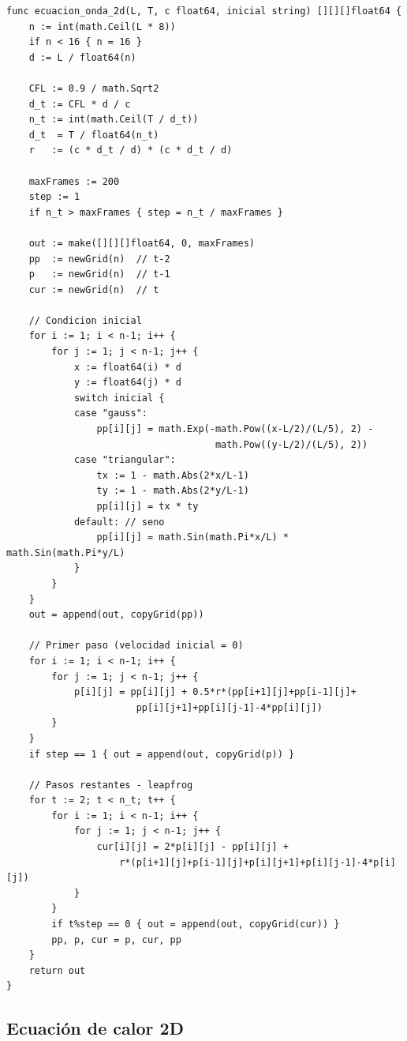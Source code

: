 \documentclass[12pt, a4paper]{article}
\begin{document}
\begin{lstlisting}[style=golang, caption={Solver de la ecuación de onda 2D — \texttt{solver.go}}, label=lst:onda2d]
func ecuacion_onda_2d(L, T, c float64, inicial string) [][][]float64 {
    n := int(math.Ceil(L * 8))
    if n < 16 { n = 16 }
    d := L / float64(n)

    CFL := 0.9 / math.Sqrt2
    d_t := CFL * d / c
    n_t := int(math.Ceil(T / d_t))
    d_t  = T / float64(n_t)
    r   := (c * d_t / d) * (c * d_t / d)

    maxFrames := 200
    step := 1
    if n_t > maxFrames { step = n_t / maxFrames }

    out := make([][][]float64, 0, maxFrames)
    pp  := newGrid(n)  // t-2
    p   := newGrid(n)  // t-1
    cur := newGrid(n)  // t

    // Condicion inicial
    for i := 1; i < n-1; i++ {
        for j := 1; j < n-1; j++ {
            x := float64(i) * d
            y := float64(j) * d
            switch inicial {
            case "gauss":
                pp[i][j] = math.Exp(-math.Pow((x-L/2)/(L/5), 2) -
                                     math.Pow((y-L/2)/(L/5), 2))
            case "triangular":
                tx := 1 - math.Abs(2*x/L-1)
                ty := 1 - math.Abs(2*y/L-1)
                pp[i][j] = tx * ty
            default: // seno
                pp[i][j] = math.Sin(math.Pi*x/L) * math.Sin(math.Pi*y/L)
            }
        }
    }
    out = append(out, copyGrid(pp))

    // Primer paso (velocidad inicial = 0)
    for i := 1; i < n-1; i++ {
        for j := 1; j < n-1; j++ {
            p[i][j] = pp[i][j] + 0.5*r*(pp[i+1][j]+pp[i-1][j]+
                       pp[i][j+1]+pp[i][j-1]-4*pp[i][j])
        }
    }
    if step == 1 { out = append(out, copyGrid(p)) }

    // Pasos restantes - leapfrog
    for t := 2; t < n_t; t++ {
        for i := 1; i < n-1; i++ {
            for j := 1; j < n-1; j++ {
                cur[i][j] = 2*p[i][j] - pp[i][j] +
                    r*(p[i+1][j]+p[i-1][j]+p[i][j+1]+p[i][j-1]-4*p[i][j])
            }
        }
        if t%step == 0 { out = append(out, copyGrid(cur)) }
        pp, p, cur = p, cur, pp
    }
    return out
}
\end{lstlisting}

\subsection{Ecuación de calor 2D}
\end{document}
